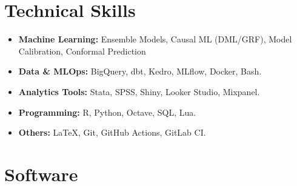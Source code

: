 \documentclass[letterpaper,11pt]{article}
\begin{document}

\ifcv
\section*{Technical Skills}

\begin{itemize}[itemsep=2pt, parsep=0pt, topsep=0pt, leftmargin=*]
  \item \textbf{Machine Learning:} Ensemble Models, Causal ML (DML/GRF), Model
        Calibration, Conformal Prediction

  \item \textbf{Data \& MLOps:} BigQuery, dbt, Kedro, MLflow, Docker, Bash.

  \item \textbf{Analytics Tools:} Stata, SPSS, Shiny, Looker Studio, Mixpanel.

  \item \textbf{Programming:} R, Python, Octave, SQL, Lua.

  \item \textbf{Others:} \LaTeX{}, Git, GitHub Actions, GitLab CI.

\end{itemize}

\fi


\ifcv
\section*{Software}

\begin{itemize}
\end{itemize}
\fi
\end{document}
